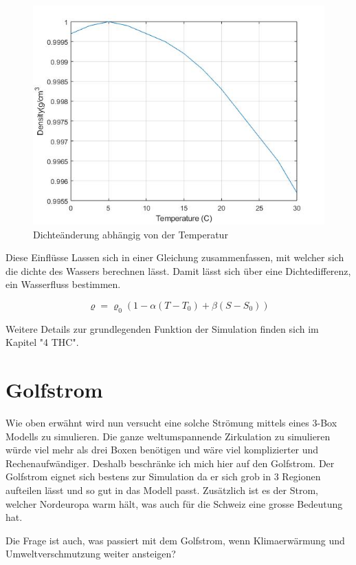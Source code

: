 \begin{figure}[H]
	\centering
	\includegraphics[width=12cm]{thermohalin/Code/graphs/graph_temp.jpg}
	\caption{Dichteänderung abhängig von der Temperatur}
\end{figure}

 Diese Einflüsse Lassen sich in einer Gleichung zusammenfassen, mit welcher sich die dichte des Wassers berechnen lässt. Damit lässt sich über eine Dichtedifferenz, ein Wasserfluss bestimmen.
 

\begin{equation}
\varrho
=
\varrho_0(1-\alpha(T-T_0)+\beta(S-S_0))
\label{skript:salinity-linear}
\end{equation} 

Weitere Details zur grundlegenden Funktion der Simulation finden sich im Kapitel "4 THC".


\section{Golfstrom}

Wie oben erwähnt wird nun versucht eine solche Strömung mittels eines 3-Box Modells zu simulieren.
Die ganze weltumspannende Zirkulation zu simulieren würde viel mehr als drei Boxen benötigen und wäre viel komplizierter und Rechenaufwändiger. Deshalb beschränke ich mich hier auf den Golfstrom.
Der Golfstrom eignet sich bestens zur Simulation da er sich grob in 3 Regionen aufteilen lässt und so gut in das Modell passt. Zusätzlich ist es der Strom, welcher Nordeuropa warm hält, was auch für die Schweiz eine grosse Bedeutung hat.

Die Frage ist auch, was passiert mit dem Golfstrom, wenn Klimaerwärmung und Umweltverschmutzung weiter ansteigen? 

